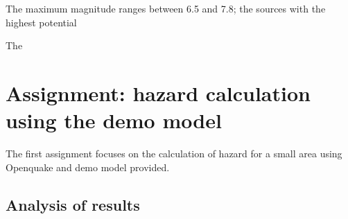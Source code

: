 The maximum magnitude ranges between 6.5 and 7.8; the sources with the
highest potential 

The 

%
\section{Assignment: hazard calculation using the demo model}
The first assignment focuses on the calculation of hazard for a small area 
using Openquake and demo model provided.


\clearpage
%
\subsection{Analysis of results}
